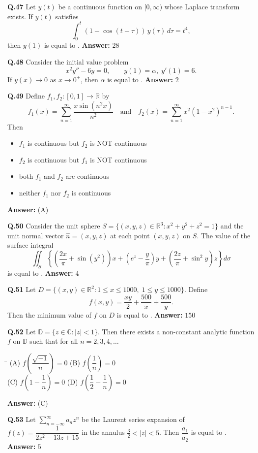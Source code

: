 \documentclass[11pt,a4paper]{article}
\newcommand{\optsfourA}[4]{%
  \begin{tabbing}
    \hspace{0.48\linewidth}\=\kill
    (A) #1 \> (B) #2 \\[2pt]
    (C) #3 \> (D) #4
  \end{tabbing}%
}
\newcommand{\optslistA}[4]{%
  \begin{itemize}
    \setlength{\itemsep}{2pt}\setlength{\parskip}{0pt}
    \item[(A)] #1
    \item[(B)] #2
    \item[(C)] #3
    \item[(D)] #4
  \end{itemize}%
}
\newcommand{\ans}[1]{\textbf{Answer:} #1\par\medskip}
\begin{document}
\textbf{Q.47} Let $y(t)$ be a continuous function on $[0, \infty)$ whose Laplace transform exists. If $y(t)$ satisfies
\[
  \int_0^t (1 - \cos(t - \tau))\, y(\tau)\,d\tau = t^4,
\]
then $y(1)$ is equal to \underline{\hspace{2cm}}.
\ans{$28$}

\textbf{Q.48} Consider the initial value problem
\[
  x^2 y'' - 6y = 0, \qquad y(1) = \alpha,\; y'(1) = 6.
\]
If $y(x) \to 0$ as $x \to 0^+$, then $\alpha$ is equal to \underline{\hspace{2cm}}.
\ans{$2$}

\textbf{Q.49} Define $f_1, f_2 : [0, 1] \to \mathbb{R}$ by
\[
  f_1(x) = \sum_{n=1}^{\infty} \frac{x\sin(n^2 x)}{n^2} \quad \text{and} \quad f_2(x) = \sum_{n=1}^{\infty} x^2 (1 - x^2)^{n-1}.
\]
Then
\optslistA{$f_1$ is continuous but $f_2$ is NOT continuous}{$f_2$ is continuous but $f_1$ is NOT continuous}{both $f_1$ and $f_2$ are continuous}{neither $f_1$ nor $f_2$ is continuous}
\ans{(A)}

\textbf{Q.50} Consider the unit sphere $S = \{(x, y, z) \in \mathbb{R}^3 : x^2 + y^2 + z^2 = 1\}$ and the unit normal vector $\hat{n} = (x, y, z)$ at each point $(x, y, z)$ on $S$. The value of the surface integral
\[
  \iint_S \left\{\left(\frac{2x}{\pi} + \sin(y^2)\right) x + \left(e^z - \frac{y}{\pi}\right) y + \left(\frac{2z}{\pi} + \sin^2 y\right) z\right\} d\sigma
\]
is equal to \underline{\hspace{2cm}}.
\ans{$4$}

\textbf{Q.51} Let $D = \{(x, y) \in \mathbb{R}^2 : 1 \le x \le 1000,\; 1 \le y \le 1000\}$. Define
\[
  f(x, y) = \frac{xy}{2} + \frac{500}{x} + \frac{500}{y}.
\]
Then the minimum value of $f$ on $D$ is equal to \underline{\hspace{2cm}}.
\ans{$150$}

\textbf{Q.52} Let $\mathbb{D} = \{z \in \mathbb{C} : |z| < 1\}$. Then there exists a non-constant analytic function $f$ on $\mathbb{D}$ such that for all $n = 2, 3, 4, \dots$
\optsfourA{$f\!\left(\dfrac{\sqrt{-1}}{n}\right) = 0$}{$f\!\left(\dfrac{1}{n}\right) = 0$}{$f\!\left(1 - \dfrac{1}{n}\right) = 0$}{$f\!\left(\dfrac{1}{2} - \dfrac{1}{n}\right) = 0$}
\ans{(C)}

\textbf{Q.53} Let $\sum_{n=-\infty}^{\infty} a_n z^n$ be the Laurent series expansion of $f(z) = \dfrac{1}{2z^2 - 13z + 15}$ in the annulus $\frac{3}{2} < |z| < 5$. Then $\dfrac{a_1}{a_2}$ is equal to \underline{\hspace{2cm}}.
\ans{$5$}
\end{document}
